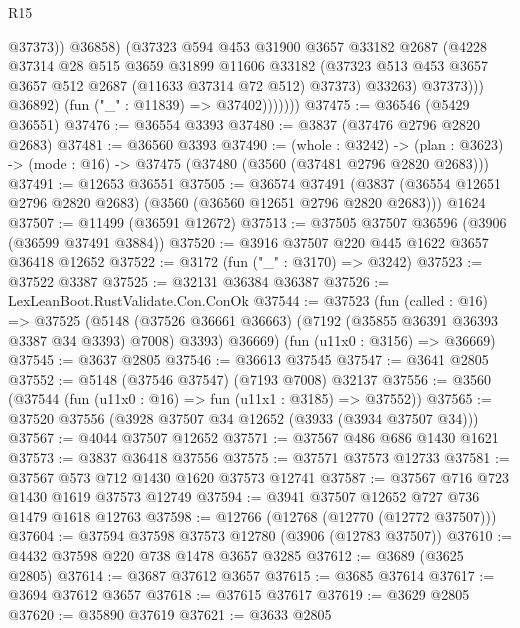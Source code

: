 \begin{lexlean}{R15}
\begin{coremodule}
                            @37373))
                        @36858)
                      (@37323
                        @594
                        @453
                        @31900
                        @3657
                        @33182
                        @2687
                        (@4228
                          @37314
                          @28
                          @515
                          @3659
                          @31899
                          @11606
                          @33182
                          (@37323 @513 @453 @3657 @3657 @512 @2687 (@11633 @37314 @72 @512) @37373)
                          @33263)
                        @37373)))
                  @36892)
                (fun ("_" : @11839) => @37402)))))))
@37475 := @36546 (@5429 @36551)
@37476 := @36554 @3393
@37480 := @3837 (@37476 @2796 @2820 @2683)
@37481 := @36560 @3393
@37490 := (whole : @3242) ->
  (plan : @3623) -> (mode : @16) -> @37475 (@37480 (@3560 (@37481 @2796 @2820 @2683)))
@37491 := @12653 @36551
@37505 := @36574
    @37491
    (@3837 (@36554 @12651 @2796 @2820 @2683) (@3560 (@36560 @12651 @2796 @2820 @2683)))
    @1624
@37507 := @11499 (@36591 @12672)
@37513 := @37505 @37507 @36596 (@3906 (@36599 @37491 @3884))
@37520 := @3916 @37507 @220 @445 @1622 @3657 @36418 @12652
@37522 := @3172 (fun ("_" : @3170) => @3242)
@37523 := @37522 @3387
@37525 := @32131 @36384 @36387
@37526 := LexLeanBoot.RustValidate.Con.ConOk
@37544 := @37523
    (fun (called : @16) =>
    @37525
      (@5148 (@37526 @36661 @36663) (@7192 (@35855 @36391 @36393 @3387 @34 @3393) @7008) @3393)
      @36669)
    (fun (u11x0 : @3156) => @36669)
@37545 := @3637 @2805
@37546 := @36613 @37545
@37547 := @3641 @2805
@37552 := @5148 (@37546 @37547) (@7193 @7008) @32137
@37556 := @3560 (@37544 (fun (u11x0 : @16) => fun (u11x1 : @3185) => @37552))
@37565 := @37520 @37556 (@3928 @37507 @34 @12652 (@3933 (@3934 @37507 @34)))
@37567 := @4044 @37507 @12652
@37571 := @37567 @486 @686 @1430 @1621
@37573 := @3837 @36418 @37556
@37575 := @37571 @37573 @12733
@37581 := @37567 @573 @712 @1430 @1620 @37573 @12741
@37587 := @37567 @716 @723 @1430 @1619 @37573 @12749
@37594 := @3941 @37507 @12652 @727 @736 @1479 @1618 @12763
@37598 := @12766 (@12768 (@12770 (@12772 @37507)))
@37604 := @37594 @37598 @37573 @12780 (@3906 (@12783 @37507))
@37610 := @4432 @37598 @220 @738 @1478 @3657 @3285
@37612 := @3689 (@3625 @2805)
@37614 := @3687 @37612 @3657
@37615 := @3685 @37614
@37617 := @3694 @37612 @3657
@37618 := @37615 @37617
@37619 := @3629 @2805
@37620 := @35890 @37619
@37621 := @3633 @2805

\end{coremodule}
\end{lexlean}
